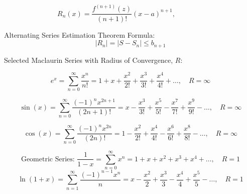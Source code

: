 \vspace*{-.1in}
\[
R_n(x) = \frac{f^{(n+1)}(z)}{(n+1)!}(x-a)^{n+1}, \qquad \qquad %
\]
\vspace*{-.2in}



{\sc Alternating Series Estimation Theorem Formula:}
\vspace*{-.1in}
\[
|R_n| = \left| S - S_n \right | \leq b_{n+1}
\]



\vspace*{.1in}

%
%
%
%
%
%
%
%
%


{\sc Selected Maclaurin Series with Radius of Convergence, \(R\):}

\[
e^x = \sum_{n=0}^\infty \frac{x^n}{n!}  =  1+x+\frac{x^2}{2!}+\frac{x^3}{3!}+\frac{x^4}{4!}+\ldots, \quad R=\infty
\]

\[
\sin(x) = \sum_{n=0}^\infty \frac{(-1)^n x^{2n+1}}{(2n+1)!}  =  x-\frac{x^3}{3!}+\frac{x^5}{5!}-\frac{x^7}{7!}+\frac{x^9}{9!}-\ldots, \quad R=\infty
\]

\[
\cos(x) = \sum_{n=0}^\infty \frac{(-1)^n x^{2n}}{(2n)!}  =  1-\frac{x^2}{2!}+\frac{x^4}{4!}-\frac{x^6}{6!}+\frac{x^8}{8!}-\ldots, \quad R=\infty
\]

\[
\text{Geometric Series: } \frac{1}{1-x} = \sum_{n=0}^\infty x^{n}  =  1+x+x^2+x^3+x^4+\ldots, \quad R=1
\]
\[
\ln(1+x) = \sum_{n=1}^\infty \frac{(-1)^{n-1} x^n}{n}  =  x-\frac{x^2}{2}+\frac{x^3}{3}-\frac{x^4}{4}+\frac{x^5}{5}-\ldots, \quad R=1
\]

%
